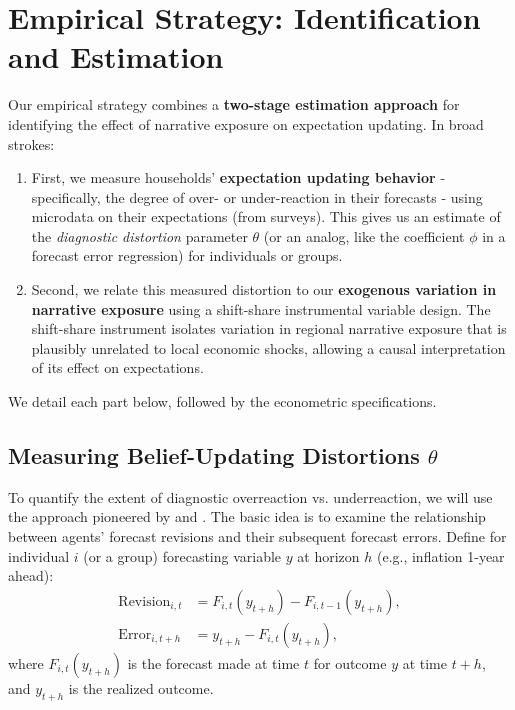 \documentclass[12pt]{article}
\begin{document}
\section{Empirical Strategy: Identification and Estimation}
Our empirical strategy combines a \textbf{two-stage estimation approach} for identifying the effect of narrative exposure on expectation updating. In broad strokes:
\begin{enumerate}
    \item First, we measure households' \textbf{expectation updating behavior} - specifically, the degree of over- or under-reaction in their forecasts - using microdata on their expectations (from surveys). This gives us an estimate of the \emph{diagnostic distortion} parameter $\theta$ (or an analog, like the coefficient $\phi$ in a forecast error regression) for individuals or groups.
    \item Second, we relate this measured distortion to our \textbf{exogenous variation in narrative exposure} using a shift-share instrumental variable design. The shift-share instrument isolates variation in regional narrative exposure that is plausibly unrelated to local economic shocks, allowing a causal interpretation of its effect on expectations.
\end{enumerate}
We detail each part below, followed by the econometric specifications.


\subsection{Measuring Belief-Updating Distortions \texorpdfstring{$\theta$}{theta}}
To quantify the extent of diagnostic overreaction vs. underreaction, we will use the approach pioneered by \citet{CoibionGorodnichenko2015} and \citet{BordaloGennaioliMaShleifer2020}. The basic idea is to examine the relationship between agents' forecast revisions and their subsequent forecast errors. Define for individual $i$ (or a group) forecasting variable $y$ at horizon $h$ (e.g., inflation 1-year ahead):
\begin{align*}
    \text{Revision}_{i,t} & = F_{i,t}(y_{t+h}) - F_{i,t-1}(y_{t+h}), \\
    \text{Error}_{i,t+h}  & = y_{t+h} - F_{i,t}(y_{t+h}),
\end{align*}
where $F_{i,t}(y_{t+h})$ is the forecast made at time $t$ for outcome $y$ at time $t+h$, and $y_{t+h}$ is the realized outcome.
\end{document}
